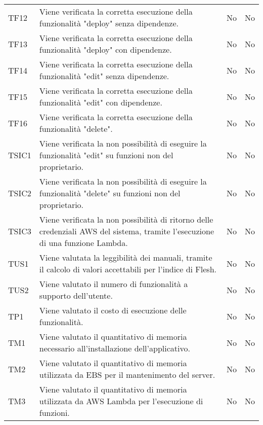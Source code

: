 \begin{longtable}{
		>{\centering}p{}
		>{}p{}
		>{\centering}p{}
		>{\centering}p{} }
		TF12 & Viene verificata la corretta esecuzione della funzionalità "deploy" senza dipendenze. &
		No &
		No \tabularnewline
		
		TF13 & Viene verificata la corretta esecuzione della funzionalità "deploy" con dipendenze. &
		No &
		No \tabularnewline
		
		TF14 & Viene verificata la corretta esecuzione della funzionalità "edit" senza dipendenze. &
		No &
		No \tabularnewline
		
		TF15 & Viene verificata la corretta esecuzione della funzionalità "edit" con dipendenze. &
		No &
		No \tabularnewline
		
		TF16 & Viene verificata la corretta esecuzione della funzionalità "delete". &
		No &
		No \tabularnewline
		
		
		
		
		TSIC1 & Viene verificata la non possibilità di eseguire la funzionalità "edit" su funzioni non del proprietario. &
		No &
		No \tabularnewline
		
		TSIC2 & Viene verificata la non possibilità di eseguire la funzionalità "delete" su funzioni non del proprietario. &
		No &
		No \tabularnewline
		
		TSIC3 & Viene verificata la non possibilità di ritorno delle credenziali AWS\ped{\textit{G}} del sistema, tramite l'esecuzione di una funzione Lambda\ped{\textit{G}}. &
		No &
		No \tabularnewline
		
		
		
		
		TUS1 & Viene valutata la leggibilità dei manuali, tramite il calcolo di valori accettabili per l'indice di Flesh. &
		No &
		No \tabularnewline
		
		TUS2 & Viene valutato il numero di funzionalità a supporto dell'utente. &
		No &
		No \tabularnewline




		TP1 & Viene valutato il costo di esecuzione delle funzionalità. &
		No &
		No \tabularnewline
		
		
		
		

		TM1 & Viene valutato il quantitativo di memoria necessario all'installazione dell'applicativo. &
		No &
		No \tabularnewline
		
		TM2 & Viene valutato il quantitativo di memoria utilizzata da EBS per il mantenimento del server. &
		No &
		No \tabularnewline
		
		TM3 & Viene valutato il quantitativo di memoria utilizzata da AWS Lambda per l'esecuzione di funzioni. &
		No &
		No \tabularnewline
		





\end{longtable}
